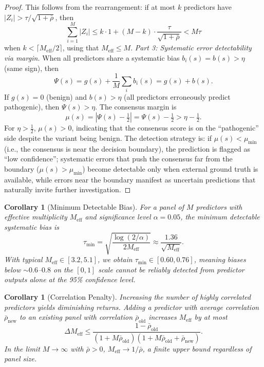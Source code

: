 \documentclass[11pt,a4paper]{article}
\newtheorem{corollary}[theorem]{Corollary}
\theoremstyle{definition}
\newcommand{\consensus}{\Psi}
\begin{document}
\begin{proof}
This follows from the rearrangement: if at most $k$ predictors have $|Z_i| > \tau / \sqrt{1+\bar{\rho}}$, then
\begin{equation}
    \sum_{i=1}^{M} |Z_i| \leq k \cdot 1 + (M-k) \cdot \frac{\tau}{\sqrt{1+\bar{\rho}}} < M\tau
\end{equation}
when $k < \lceil M_{\text{eff}}/2 \rceil$, using that $M_{\text{eff}} \leq M$.
\medskip\noindent\textit{Part 3: Systematic error detectability via margin.}
When all predictors share a systematic bias $b_i(s) = b(s) > \eta$ (same sign), then
\begin{equation}
    \consensus(s) = g(s) + \frac{1}{M}\sum_i b_i(s) = g(s) + b(s).
\end{equation}
If $g(s) = 0$ (benign) and $b(s) > \eta$ (all predictors erroneously predict pathogenic), then $\consensus(s) > \eta$.
The consensus margin is
\begin{equation}
    \mu(s) = |\consensus(s) - \tfrac{1}{2}| = \consensus(s) - \tfrac{1}{2} > \eta - \tfrac{1}{2}.
\end{equation}
For $\eta > \frac{1}{2}$, $\mu(s) > 0$, indicating that the consensus score is on the ``pathogenic'' side despite the variant being benign.
The detection strategy is: if $\mu(s) < \mu_{\min}$ (i.e., the consensus is near the decision boundary), the prediction is flagged as ``low confidence''; systematic errors that push the consensus far from the boundary ($\mu(s) > \mu_{\min}$) become detectable only when external ground truth is available, while errors near the boundary manifest as uncertain predictions that naturally invite further investigation.
\end{proof}
\begin{corollary}[Minimum Detectable Bias]
\label{cor:min-detectable}
For a panel of $M$ predictors with effective multiplicity $M_{\text{eff}}$ and significance level $\alpha = 0.05$, the minimum detectable systematic bias is
\begin{equation}
    \tau_{\min} = \sqrt{\frac{\log(2/\alpha)}{2M_{\text{eff}}}} \approx \frac{1.36}{\sqrt{M_{\text{eff}}}}.
\end{equation}
With typical $M_{\text{eff}} \in [3.2, 5.1]$, we obtain $\tau_{\min} \in [0.60, 0.76]$, meaning biases below $\sim 0.6$--$0.8$ on the $[0,1]$ scale cannot be reliably detected from predictor outputs alone at the 95\% confidence level.
\end{corollary}
\begin{corollary}[Correlation Penalty]
\label{cor:corr-penalty}
Increasing the number of highly correlated predictors yields diminishing returns.
Adding a predictor with average correlation $\bar{\rho}_{\text{new}}$ to an existing panel with correlation $\bar{\rho}_{\text{old}}$ increases $M_{\text{eff}}$ by at most
\begin{equation}
    \Delta M_{\text{eff}} \leq \frac{1 - \bar{\rho}_{\text{old}}}{(1 + M\bar{\rho}_{\text{old}})(1 + M\bar{\rho}_{\text{old}} + \bar{\rho}_{\text{new}})}.
\end{equation}
In the limit $M \to \infty$ with $\bar{\rho} > 0$, $M_{\text{eff}} \to 1/\bar{\rho}$, a finite upper bound regardless of panel size.
\end{corollary}
\end{document}
